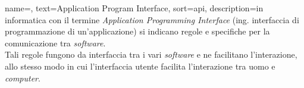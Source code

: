 


    

 {
    name=,
    text=Application Program Interface,
    sort=api,
    description={in informatica con il termine \emph{Application Programming Interface} (ing. interfaccia di programmazione di un'applicazione) si indicano regole e specifiche per la comunicazione tra \textit{software}. \\
    Tali regole fungono da interfaccia tra i vari \textit{software} e ne facilitano l’interazione, allo stesso modo in cui l’interfaccia utente facilita l’interazione tra uomo e \textit{computer}. \\
    \cite{site:api-treccani}
    }
}